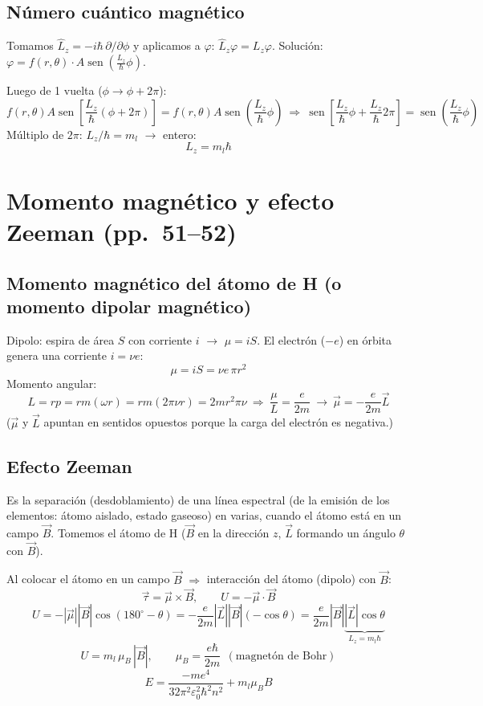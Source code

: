 \documentclass[11pt,a4paper]{article}
\newcommand{\pags}[1]{{\normalfont\small\color{gris}(pp.~#1)}}
\DeclareMathOperator{\sen}{sen}
\begin{document}
\subsection{Número cuántico magnético}
Tomamos $\hat L_z=-i\hbar\,\partial/\partial\phi$ y aplicamos a $\varphi$: $\hat L_z\varphi=L_z\varphi$.
Solución: $\varphi=f(r,\theta)\cdot A\sen\!\left(\frac{L_z}{\hbar}\phi\right)$.

Luego de 1 vuelta ($\phi\to\phi+2\pi$):
\[
f(r,\theta)A\sen\!\left[\frac{L_z}{\hbar}(\phi+2\pi)\right]=f(r,\theta)A\sen\!\left(\frac{L_z}{\hbar}\phi\right)
\ \Rightarrow\
\sen\!\left[\frac{L_z}{\hbar}\phi+\frac{L_z}{\hbar}2\pi\right]=\sen\!\left(\frac{L_z}{\hbar}\phi\right)
\]
Múltiplo de $2\pi$: $L_z/\hbar=m_l$ $\rightarrow$ entero:
\[
\boxed{L_z=m_l\hbar}
\]

\section{Momento magnético y efecto Zeeman \pags{51--52}}

\subsection{Momento magnético del átomo de H (o momento dipolar magnético)}
Dipolo: espira de área $S$ con corriente $i$ $\rightarrow$ $\mu=iS$. El electrón ($-e$) en órbita genera una corriente $i=\nu e$:
\[
\mu=iS=\nu e\,\pi r^2
\]
Momento angular:
\[
L=rp=rm(\omega r)=rm(2\pi\nu r)=2mr^2\pi\nu
\ \Rightarrow\
\frac{\mu}{L}=\frac{e}{2m}\ \rightarrow\ \boxed{\vec\mu=-\frac{e}{2m}\vec L}
\]
($\vec\mu$ y $\vec L$ apuntan en sentidos opuestos porque la carga del electrón es negativa.)

\subsection{Efecto Zeeman}
Es la separación (desdoblamiento) de una línea espectral (de la emisión de los elementos: átomo aislado, estado gaseoso)
en varias, cuando el átomo está en un campo $\vec B$. Tomemos el átomo de H ($\vec B$ en la dirección $z$, $\vec L$ formando
un ángulo $\theta$ con $\vec B$).

Al colocar el átomo en un campo $\vec B$ $\Rightarrow$ interacción del átomo (dipolo) con $\vec B$:
\[
\vec\tau=\vec\mu\times\vec B,\qquad U=-\vec\mu\cdot\vec B
\]
\[
U=-|\vec\mu||\vec B|\cos(180^\circ-\theta)=-\frac{e}{2m}|\vec L||\vec B|(-\cos\theta)=\frac{e}{2m}|\vec B|\underbrace{|\vec L|\cos\theta}_{L_z=m_l\hbar}
\]
\[
\boxed{U=m_l\,\mu_B\,|\vec B|},\qquad \mu_B=\frac{e\hbar}{2m}\ \ (\text{magnetón de Bohr})
\]
\[
E=\frac{-me^4}{32\pi^2\varepsilon_0^2\hbar^2n^2}+m_l\mu_BB
\]
\end{document}
